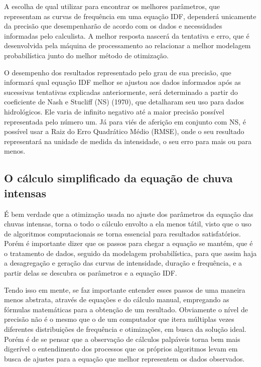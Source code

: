 A escolha de qual utilizar para encontrar os melhores parâmetros, que representam as curvas de frequência em uma equação IDF, dependerá unicamente da precisão que desempenharão de acordo com os dados e necessidades informadas pelo calculista. A melhor resposta nascerá da tentativa e erro, que é desenvolvida pela máquina de processamento ao relacionar a melhor modelagem probabilística junto do melhor método de otimização.

\newpage

O desempenho dos resultados representado pelo grau de sua precisão, que informará qual equação IDF melhor se ajustou aos dados informados após as sucessivas tentativas explicadas anteriormente, será determinado a partir do coeficiente de Nash e Stucliff (NS) (1970), que detalharam seu uso para dados hidrológicos. Ele varia de infinito negativo até a maior precisão possível representada pelo número um. Já para viés de aferição em conjunto com NS, é possível usar a Raiz do Erro Quadrático Médio (RMSE), onde o seu resultado representará na unidade de medida da intensidade, o seu erro para mais ou para menos.

\subsection{O cálculo simplificado da equação de chuva intensas}

É bem verdade que a otimização usada no ajuste dos parâmetros da equação das chuvas intensas, torna o todo o cálculo envolto a ela menos tátil, visto que o uso de algoritmos computacionais se torna essencial para resultados satisfatórios. Porém é importante dizer que os passos para chegar a equação se mantém, que é o tratamento de dados, seguido da modelagem probabilística, para que assim haja a desagregação e geração das curvas de intensidade, duração e frequência, e a partir delas se descubra os parâmetros e a equação IDF.

Tendo isso em mente, se faz importante entender esses passos de uma maneira menos abstrata, através de equações e do cálculo manual, empregando as fórmulas matemáticas para a obtenção de um resultado. Obviamente o nível de precisão não é o mesmo que o de um computador que itera múltiplas vezes diferentes distribuições de frequência e otimizações, em busca da solução ideal. Porém é de se pensar que a observação de cálculos palpáveis torna bem mais digerível o entendimento dos processos que os próprios algoritmos levam em busca de ajustes para a equação que melhor representem os dados observados.

